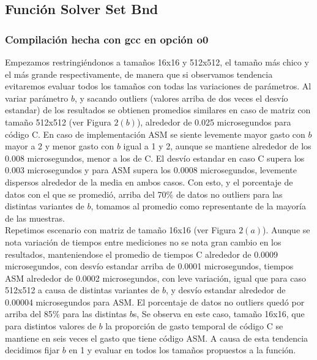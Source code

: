  

 
\subsection{Función Solver Set Bnd }
 \subsubsection{Compilación hecha con gcc en opción o0} 
Empezamos restringiéndonos a tamaños 16x16 y 512x512, el tamaño más chico y el más grande respectivamente, de manera que si observamos tendencia evitaremos evaluar todos los tamaños con todas las variaciones de parámetros. Al variar parámetro $b$, y sacando outliers (valores arriba de dos veces el desvío estandar) de los resultados se obtienen promedios similares en caso de matriz con tamaño 512x512 (ver Figura $2(b)$), alrededor de 0.025 microsegundos para código C. En caso de implementación ASM se siente levemente mayor gasto con $b$ mayor a 2 y menor gasto con $b$ igual a 1 y 2, aunque se mantiene alrededor de los 0.008 microsegundos, menor a los de C. El desvío estandar en caso C supera los 0.003 microsegundos y para ASM supera los 0.0008 microsegundos, levemente dispersos alrededor de la media en ambos casos. Con esto, y el porcentaje de datos con el que se promedió, arriba del 70$\%$ de datos no outliers para las distintas variantes de $b$, tomamos al promedio como representante de la mayoría de las muestras.\\
Repetimos escenario con matriz de tamaño 16x16 (ver Figura $2(a)$). Aunque se nota variación de tiempos entre mediciones no se nota gran cambio en los resultados, manteniendose el promedio de tiempos C alrededor de 0.0009 microsegundos, con desvío estandar arriba de 0.0001 microsegundos, tiempos ASM alrededor de 0.0002 microsegundos, con leve variación, igual que para caso 512x512 a causa de distintas variantes de $b$, y desvío estandar alrededor de 0.00004 microsegundos para ASM. El porcentaje de datos no outliers quedó por arriba del 85$\%$ para las distintas $b$s,
Se observa en este caso, tamaño 16x16, que para distintos valores de $b$ la proporción de gasto temporal de código C se mantiene en 
seis veces el gasto que tiene código ASM. A causa de esta tendencia decidimos fijar $b$ en 1 y evaluar en todos los tamaños propuestos a la función. 
\newline

